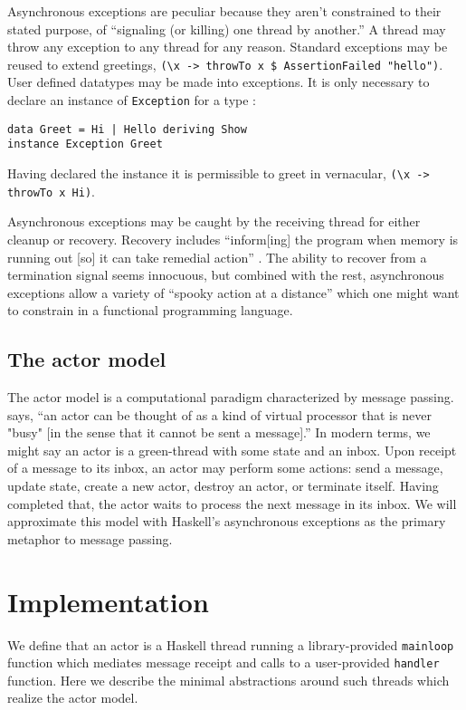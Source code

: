 \documentclass[sigplan,screen,review,anonymous]{acmart}
\begin{document}
Asynchronous exceptions are peculiar because they aren't constrained to their
stated purpose, \cite{marlow2001async} of ``signaling (or killing) one
thread by another.''
%
A thread may throw any exception to any thread for any reason.
%
Standard exceptions may be reused to extend greetings,
\verb|(\x -> throwTo x $ AssertionFailed "hello")|.
%
User defined datatypes may be made into exceptions.
%
It is only necessary to declare an instance of \verb|Exception| for a type
\cite{marlow2006extensible}:
%
\begin{verbatim}
data Greet = Hi | Hello deriving Show
instance Exception Greet
\end{verbatim}
%
Having declared the instance it is permissible to greet in vernacular,
\verb|(\x -> throwTo x Hi)|.

Asynchronous exceptions may be caught by the receiving thread for
either cleanup or recovery.
%
Recovery includes ``inform[ing] the program when memory is running out [so] it
can take remedial action'' \cite{marlow2001async}.
%
The ability to recover from a termination signal seems innocuous, but combined
with the rest, asynchronous exceptions allow a variety of ``spooky action at a
distance'' which one might want to constrain in a functional programming
language.

\subsection{The actor model}

The actor model is a computational paradigm characterized by message passing.
%
\cite{hewitt1973actors} says, ``an actor can be thought of as a kind of virtual
processor that is never "busy" [in the sense that it cannot be sent a
message].''
%
In modern terms, we might say an actor is a green-thread with some state and an
inbox.
%
Upon receipt of a message to its inbox, an actor may perform some actions: send
a message, update state, create a new actor, destroy an actor, or terminate
itself.
%
Having completed that, the actor waits to process the next message in its
inbox.
%
We will approximate this model with Haskell's asynchronous exceptions as the
primary metaphor to message passing.




\section{Implementation}

We define that an actor is a Haskell thread running a library-provided
\verb|mainloop| function which mediates message receipt and calls to a
user-provided \verb|handler| function.
%
Here we describe the minimal abstractions around such threads which realize the
actor model.
\end{document}
